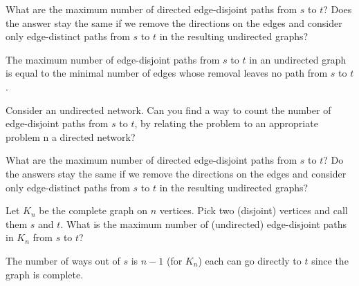 \documentclass[10pt, a4paper]{article}
\begin{document}
\begin{example}
\begin{solution}
\begin{figure}[H]
        \end{figure}
    \end{solution}
\end{example}

\begin{example}
    What are the maximum number of directed edge-disjoint paths from $s$ to $t$?
    Does the answer stay the same if we remove the directions on the edges and consider only edge-distinct paths from $s$ to $t$ in the resulting undirected graphs?
\end{example}

\begin{theorem}
    The maximum number of edge-disjoint paths from $s$ to $t$ in an undirected graph is equal to the minimal number of edges whose removal leaves no path from $s$ to $t$.
\end{theorem}

\begin{example}
    Consider an undirected network.
    Can you find a way to count the number of edge-disjoint paths from $s$ to $t$,
    by relating the problem to an appropriate problem n a directed network?
\end{example}

\begin{example}
    What are the maximum number of directed edge-disjoint paths from $s$ to $t$?
    Do the answers stay the same if we remove the directions on the edges and consider only edge-distinct paths from $s$ to $t$ in the resulting undirected graphs?
\end{example}

\begin{example}
    Let $K_n$ be the complete graph on $n$ vertices.
    Pick two
    (disjoint)
    vertices and call them $s$ and $t$.
    What is the maximum number of
    (undirected)
    edge-disjoint paths in $K_n$ from $s$ to $t$?

    \begin{solution}
        The number of ways out of $s$ is $n - 1$
        (for $K_n$)
        each can go directly to $t$ since the graph is complete.
    \end{solution}
\end{example}
\end{document}
